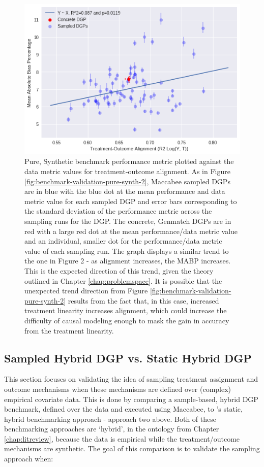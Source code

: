 \documentclass[../main.tex]{subfiles}
\begin{document}
\begin{figure}[ht!]
    \centering
    \includegraphics[width=0.9\linewidth]{figures/ch7-benchmark-pure-synth-3.png}
    \caption{Pure, Synthetic benchmark performance metric plotted against the data metric values for treatment-outcome alignment. As in Figure \ref{fig:benchmark-validation-pure-synth-2}, Maccabee sampled DGPs are in blue with the blue dot at the mean performance and data metric value for each sampled DGP and error bars corresponding to the standard deviation of the performance metric across the sampling runs for the DGP. The concrete, Genmatch DGPs are in red with a large red dot at the mean performance/data metric value and an individual, smaller dot for the performance/data metric value of each sampling run. The graph displays a similar trend to the one in Figure 2 - as alignment increases, the MABP increases. This is the expected direction of this trend, given the theory outlined in Chapter \ref{chap:problemspace}. It is possible that the unexpected trend direction from Figure \ref{fig:benchmark-validation-pure-synth-2} results from the fact that, in this case, increased treatment linearity increases alignment, which could increase the difficulty of causal modeling enough to mask the gain in accuracy from the treatment linearity.}
    \label{fig:benchmark-validation-pure-synth-3}
\end{figure}
\FloatBarrier

\subsection{Sampled Hybrid DGP vs. Static Hybrid DGP}

This section focuses on validating the idea of sampling treatment assignment and outcome mechanisms when these mechanisms are defined over (complex) empirical covariate data. This is done by comparing a sample-based, hybrid DGP benchmark, defined over the \textcite{Lalonde1986EvaluatingData} data and executed using Maccabee, to \citeauthor{Diamond2013GeneticStudies}'s static, hybrid benchmarking approach - approach two above. Both of these benchmarking approaches are `hybrid', in the ontology from Chapter \ref{chap:litreview}, because the data is empirical while the treatment/outcome mechanisms are synthetic. The goal of this comparison is to validate the sampling approach when:
\end{document}
